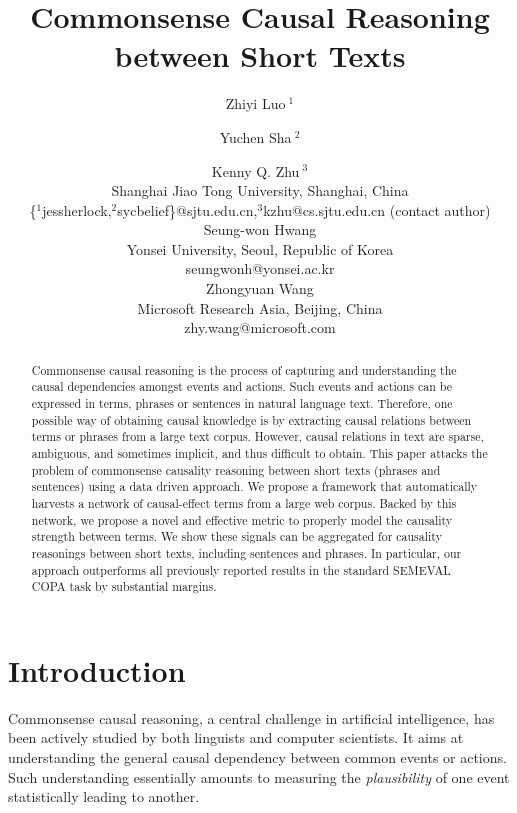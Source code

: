 \documentclass[letterpaper]{article}
\begin{document}
\title{Commonsense Causal Reasoning between Short Texts}

\author{
Zhiyi Luo{\small $~^{1}$} \and Yuchen Sha{\small $~^{2}$} \and Kenny Q. Zhu{\small $~^{3}$}\\
Shanghai Jiao Tong University, Shanghai, China\\
\{{\small $^{1}$}jessherlock,{\small $^{2}$}sycbelief\}@sjtu.edu.cn,{\small $^{3}$}kzhu@cs.sjtu.edu.cn (contact author)\\
\AND
Seung-won Hwang\\
Yonsei University, Seoul, Republic of Korea\\
seungwonh@yonsei.ac.kr\\
\And
Zhongyuan Wang\\
Microsoft Research Asia, Beijing, China\\
zhy.wang@microsoft.com
}
\maketitle
\begin{abstract}
Commonsense causal reasoning is the process of capturing and understanding
the causal dependencies amongst events and actions.
Such events and actions can be expressed in terms, phrases or
sentences in natural language text.
Therefore, one possible way of obtaining causal knowledge is by extracting
causal relations between terms or phrases from a large text corpus.
However, causal relations in text are sparse, ambiguous, and sometimes implicit,
and thus difficult to obtain.
This paper attacks the problem of commonsense causality reasoning between short
texts (phrases and sentences) using a data driven approach.
We propose a framework that automatically harvests a network of
causal-effect terms from a large web corpus.
Backed by this network, we propose a novel and effective metric to properly
model the causality strength between terms. We show these signals
can be aggregated for causality reasonings between
short texts, including sentences and phrases.
In particular, our approach outperforms all previously
reported results in the standard SEMEVAL COPA task by substantial margins.
\end{abstract}

% 
\section{Introduction}
\label{sec:intro}

Commonsense causal reasoning, a central challenge in artificial intelligence,
has been actively studied by both linguists and computer scientists.
It aims at understanding the general causal dependency
between common events or actions.
Such understanding essentially amounts to measuring the {\em plausibility} of
one event statistically leading to another.
\end{document}

